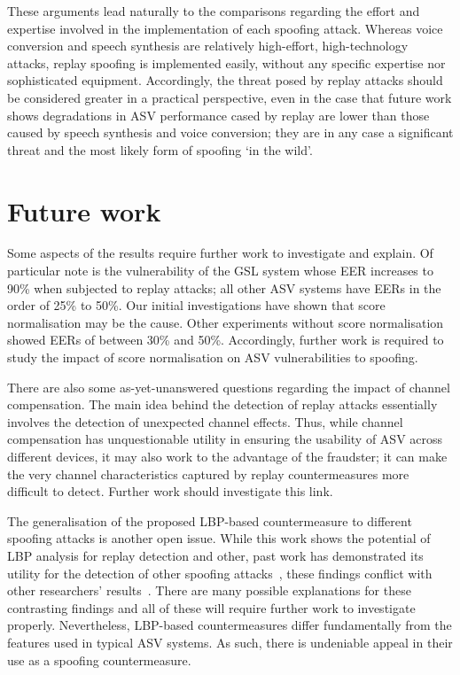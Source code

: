 These arguments lead naturally to the comparisons regarding the effort and expertise involved in the implementation of each spoofing attack.  Whereas voice conversion and speech synthesis are relatively high-effort, high-technology attacks, replay spoofing is implemented easily, without any specific expertise nor sophisticated equipment.  Accordingly, the threat posed by replay attacks should be considered greater in a practical perspective, even in the case that future work shows degradations in ASV performance cased by replay are lower than those caused by speech synthesis and voice conversion; they are in any case a significant threat and the most likely form of spoofing `in the wild'.




\section{Future work}
\label{sec::future}

Some aspects of the results require further work to investigate and explain.  Of particular note is the vulnerability of the GSL system whose EER increases to 90\% when subjected to replay attacks; all other ASV systems have EERs in the order of 25\% to 50\%.  Our initial investigations have shown that score normalisation may be the cause.  Other experiments without score normalisation showed EERs of between 30\% and 50\%.  Accordingly, further work is required to study the impact of score normalisation on ASV vulnerabilities to spoofing. 

There are also some as-yet-unanswered questions regarding the impact of channel compensation.  The main idea behind the detection of replay attacks essentially involves the detection of unexpected channel effects.  Thus, while channel compensation has unquestionable utility in ensuring the usability of ASV across different devices, it may also work to the advantage of the fraudster; it can make the very channel characteristics captured by replay countermeasures more difficult to detect.  %
Further work should investigate this link.

The generalisation of the proposed LBP-based countermeasure to different spoofing attacks is another open issue.  While this work shows the potential of LBP analysis for replay detection and other, past work has demonstrated its utility for the detection of other spoofing attacks~\cite{Alegre2013a}, these findings conflict with other researchers' results~\cite{Sahidullah2015}.  There are many possible explanations for these contrasting findings and all of these will require further work to investigate properly.  Nevertheless, LBP-based countermeasures differ fundamentally from the features used in typical ASV systems.  As such, there is undeniable appeal in their use as a spoofing countermeasure.

